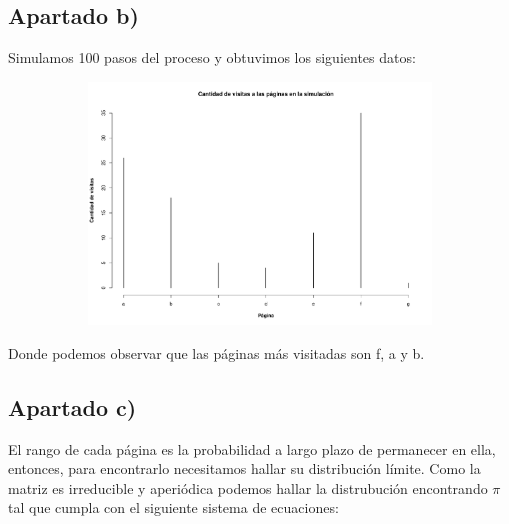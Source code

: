 \documentclass[11pt]{article}
\begin{document}

\newpage
\subsection*{Apartado b)}

Simulamos 100 pasos del proceso y obtuvimos los siguientes datos:

\begin{figure}[h!]
  \begin{center}
    \begin{subfigure}[b]{0.9\linewidth}
      \includegraphics[width=\linewidth]{bastonesPageRank.pdf}
    \end{subfigure}
  \end{center}
\end{figure}

Donde podemos observar que las páginas más visitadas son f, a y b.


\subsection*{Apartado c)}

El rango de cada página es la probabilidad a largo plazo de permanecer en ella,
entonces, para encontrarlo necesitamos hallar su distribución límite. Como la matriz
es irreducible y aperiódica podemos hallar la distrubución encontrando
$\pi$ tal que cumpla con el siguiente sistema de ecuaciones:
\end{document}
